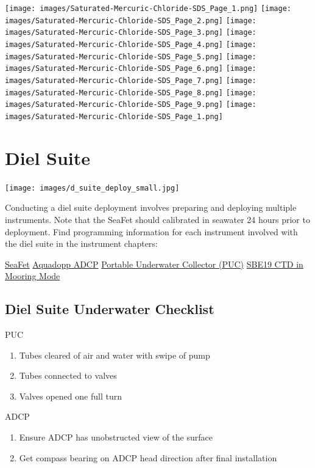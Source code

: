 \documentclass[]{book}
\providecommand{\tightlist}{%
  \setlength{\itemsep}{0pt}\setlength{\parskip}{0pt}}
\begin{document}
\texttt{[image: images/Saturated-Mercuric-Chloride-SDS\_Page\_1.png]}
\texttt{[image: images/Saturated-Mercuric-Chloride-SDS\_Page\_2.png]}
\texttt{[image: images/Saturated-Mercuric-Chloride-SDS\_Page\_3.png]}
\texttt{[image: images/Saturated-Mercuric-Chloride-SDS\_Page\_4.png]}
\texttt{[image: images/Saturated-Mercuric-Chloride-SDS\_Page\_5.png]}
\texttt{[image: images/Saturated-Mercuric-Chloride-SDS\_Page\_6.png]}
\texttt{[image: images/Saturated-Mercuric-Chloride-SDS\_Page\_7.png]}
\texttt{[image: images/Saturated-Mercuric-Chloride-SDS\_Page\_8.png]}
\texttt{[image: images/Saturated-Mercuric-Chloride-SDS\_Page\_9.png]}
\texttt{[image: images/Saturated-Mercuric-Chloride-SDS\_Page\_1.png]}

\hypertarget{dielsuite}{%
\chapter{Diel Suite}\label{dielsuite}}

\texttt{[image: images/d\_suite\_deploy\_small.jpg]}

Conducting a diel suite deployment involves preparing and deploying multiple instruments. Note that the SeaFet should calibrated in seawater 24 hours prior to deployment. Find programming information for each instrument involved with the diel suite in the instrument chapters:

\protect\hyperlink{seafet}{SeaFet}
\protect\hyperlink{adcp}{Aquadopp ADCP}
\protect\hyperlink{puc}{Portable Underwater Collector (PUC)}
\protect\hyperlink{moored_ctd}{SBE19 CTD in Mooring Mode}

\hypertarget{diel-suite-underwater-checklist}{%
\section{Diel Suite Underwater Checklist}\label{diel-suite-underwater-checklist}}

PUC

\begin{enumerate}
\def\labelenumi{\arabic{enumi}.}
\tightlist
\item
  Tubes cleared of air and water with swipe of pump
\item
  Tubes connected to valves
\item
  Valves opened one full turn
\end{enumerate}

ADCP

\begin{enumerate}
\def\labelenumi{\arabic{enumi}.}
\tightlist
\item
  Ensure ADCP has unobstructed view of the surface
\item
  Get compass bearing on ADCP head direction after final installation
\end{enumerate}
\end{document}
